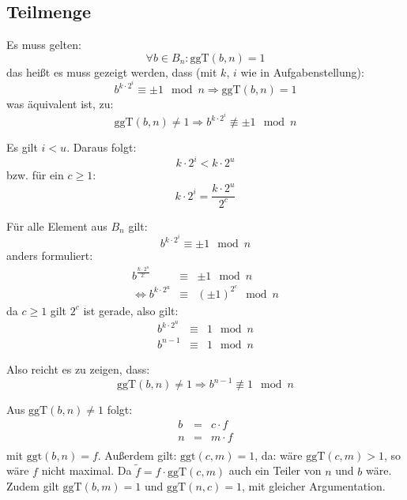 \documentclass[DIN, pagenumber=false, fontsize=11pt, parskip=half]{scrartcl}
\begin{document}
    \subsection{Teilmenge}
    Es muss gelten:
    \begin{equation}
        \forall b \in B_n: \text{ggT}(b, n) = 1
    \end{equation}
    das heißt es muss gezeigt werden, dass (mit $k$, $i$ wie in Aufgabenstellung):
    \begin{equation}
        b^{k \cdot 2^i} \equiv \pm 1 \mod n \Rightarrow \text{ggT}(b, n) = 1
    \end{equation}
    was äquivalent ist, zu:
    \begin{equation}
        \text{ggT}(b, n) \neq 1 \Rightarrow b^{k \cdot 2^i} \not\equiv \pm 1 \mod n
    \end{equation}

    Es gilt $i < u$. Daraus folgt:
    \begin{equation}
        k \cdot 2^i < k \cdot 2^u 
    \end{equation}
    bzw. für ein $c \geq 1$:
    \begin{equation}
        k \cdot 2^i = \frac{k \cdot 2^u}{2^c}
    \end{equation}

    Für alle Element aus $B_n$ gilt:
    \begin{equation}
        b^{k \cdot 2^i} \equiv \pm 1 \mod n
    \end{equation}
    anders formuliert:
    \begin{eqnarray}
        b^{\frac{k \cdot 2^u}{2^c}} &\equiv& \pm 1 \mod n \\
        \Leftrightarrow b^{k \cdot 2^u} &\equiv& {\left(\pm 1\right)}^{2^c} \mod n
    \end{eqnarray}
    da $c \geq 1$ gilt $2^c$ ist gerade, also gilt:
    \begin{eqnarray}
        b^{k \cdot 2^u} &\equiv& 1 \mod n \\
        b^{n-1} &\equiv& 1 \mod n
    \end{eqnarray}

    Also reicht es zu zeigen, dass:
    \begin{equation}
        \text{ggT}(b, n) \neq 1 \Rightarrow b^{n-1} \not\equiv 1 \mod n
    \end{equation}

    Aus $\text{ggT}(b, n) \neq 1$ folgt:
    \begin{eqnarray}
        b &=& c \cdot f \\
        n &=& m \cdot f \\
    \end{eqnarray}
    mit $\text{ggt}(b, n) = f$. Außerdem gilt: $\text{ggt}(c, m) = 1$, da:
    wäre $\text{ggT}(c, m) > 1$, so wäre $f$ nicht maximal. 
    Da $\tilde{f} = f \cdot \text{ggT}(c, m)$ auch ein Teiler von $n$ und $b$ wäre.
    Zudem gilt $\text{ggT}(b, m) = 1$ und $\text{ggT}(n, c) = 1$, mit gleicher
    Argumentation.
\end{document}
